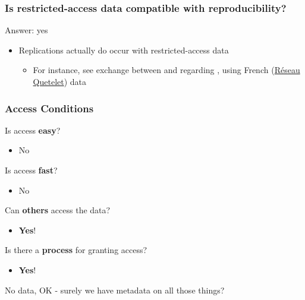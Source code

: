 \begin{frame}
\frametitle{Is restricted-access data compatible with reproducibility?}
\pause
\begin{block}{Answer: yes}
\begin{itemize}
		\item Replications actually do occur with restricted-access data 
		\begin{itemize}
			\item[\ ]For instance, see exchange between \textcite{Godechot2016} and \textcite{CheminWasmer2017erratum} regarding \textcite{CheminWasmer2009},  using French (\href{https://quetelet.casd.eu/fr/utilisateur/connexion}{R\'eseau Quetelet}) data 
		\end{itemize}
	\end{itemize}
\end{block}
\end{frame}



\begin{frame}
\frametitle{Access Conditions}
\begin{block}{Is access \textbf{easy}?}
\begin{itemize}	\item No\end{itemize}
\end{block}\pause
\begin{block}{Is access \textbf{fast}?}
	\begin{itemize}	\item No\end{itemize}
\end{block}\pause
\begin{block}{Can \textbf{others} access the data?}
	\begin{itemize}	\item \textbf{Yes}!\end{itemize}
\end{block}
\begin{block}{Is there a \textbf{process} for granting access?}
	\begin{itemize}	\item \textbf{Yes}!\end{itemize}
\end{block}
\end{frame}





\begin{frame}
\begin{center}
\huge	No data, OK - surely we have  metadata on all those things?
\end{center}
\end{frame}


